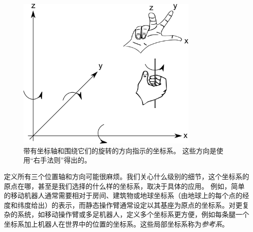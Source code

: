 \begin{figure}
	\centering
		\includegraphics[width=0.8\textwidth]{figs/coordinatesystem}
	\caption{带有坐标轴和围绕它们的旋转的方向指示的坐标系。 这些方向是使用“右手法则”得出的。}
	\label{fig:coordinatesystem}
\end{figure}


定义所有三个位置轴和方向可能很麻烦。我们关心什么级别的细节，这个坐标系的原点在哪，甚至是我们选择的什么样的坐标系，取决于具体的应用。 例如，简单的移动机器人通常需要相对于房间、建筑物或地球坐标系（由地球上的每个点的经度和纬度给出）的表示，而静态操作臂通常设定以其基座为原点的坐标系。对更复杂的系统，如移动操作臂或多足机器人，定义多个坐标系更方便，例如每条腿一个坐标系加上机器人在世界中的位置的坐标系。这些局部坐标系称为\emph{参考系}。


